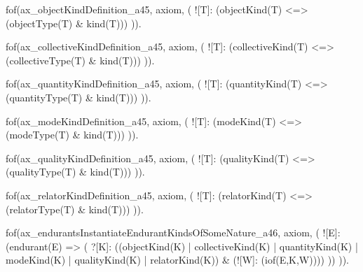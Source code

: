 
fof(ax_objectKindDefinition_a45, axiom, (
  ![T]: (objectKind(T) <=> (objectType(T) & kind(T)))
)).

fof(ax_collectiveKindDefinition_a45, axiom, (
  ![T]: (collectiveKind(T) <=> (collectiveType(T) & kind(T)))
)).

fof(ax_quantityKindDefinition_a45, axiom, (
  ![T]: (quantityKind(T) <=> (quantityType(T) & kind(T)))
)).

fof(ax_modeKindDefinition_a45, axiom, (
  ![T]: (modeKind(T) <=> (modeType(T) & kind(T)))
)).

fof(ax_qualityKindDefinition_a45, axiom, (
  ![T]: (qualityKind(T) <=> (qualityType(T) & kind(T)))
)).

fof(ax_relatorKindDefinition_a45, axiom, (
  ![T]: (relatorKind(T) <=> (relatorType(T) & kind(T)))
)).




fof(ax_endurantsInstantiateEndurantKindsOfSomeNature_a46, axiom, (
  ![E]: (endurant(E) => (
    ?[K]: ((objectKind(K) | collectiveKind(K) | quantityKind(K) | modeKind(K) | qualityKind(K) | relatorKind(K))
    & (![W]: (iof(E,K,W))))
  ))
)).





